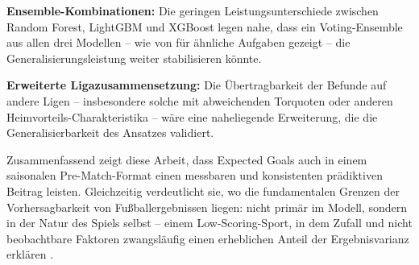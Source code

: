 \textbf{Ensemble-Kombinationen:} Die geringen Leistungsunterschiede zwischen
Random Forest, LightGBM und XGBoost legen nahe, dass ein Voting-Ensemble
aus allen drei Modellen -- wie von \textcite{MillsEtAl2024} für ähnliche
Aufgaben gezeigt -- die Generalisierungsleistung weiter stabilisieren könnte.

\textbf{Erweiterte Ligazusammensetzung:} Die Übertragbarkeit der Befunde
auf andere Ligen -- insbesondere solche mit abweichenden Torquoten oder
anderen Heimvorteils-Charakteristika -- wäre eine naheliegende Erweiterung,
die die Generalisierbarkeit des Ansatzes validiert.

Zusammenfassend zeigt diese Arbeit, dass Expected Goals auch in einem
saisonalen Pre-Match-Format einen messbaren und konsistenten prädiktiven
Beitrag leisten. Gleichzeitig verdeutlicht sie, wo die fundamentalen
Grenzen der Vorhersagbarkeit von Fußballergebnissen liegen: nicht
primär im Modell, sondern in der Natur des Spiels selbst -- einem
Low-Scoring-Sport, in dem Zufall und nicht beobachtbare Faktoren
zwangsläufig einen erheblichen Anteil der Ergebnisvarianz erklären
\cite{DobsonGoddard2011,Sumpter2016}.